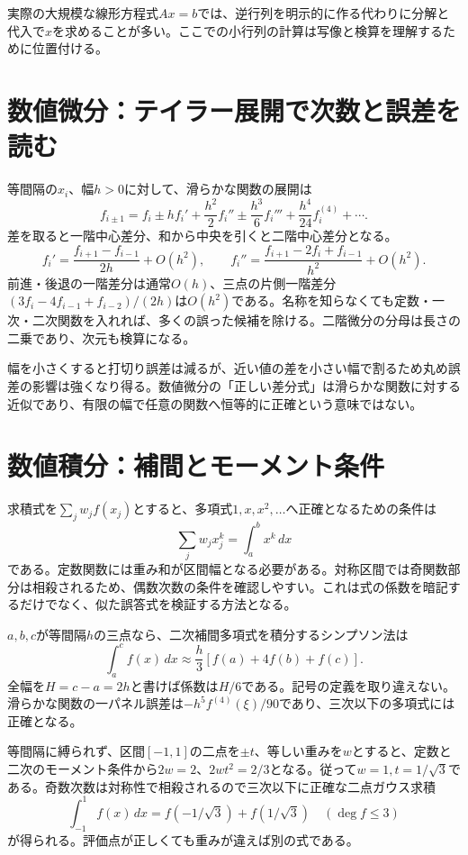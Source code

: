実際の大規模な線形方程式$Ax=b$では、逆行列を明示的に作る代わりに分解と代入で$x$を求めることが多い。ここでの小行列の計算は写像と検算を理解するために位置付ける。

\section{数値微分：テイラー展開で次数と誤差を読む}
\label{theory:analysis:difference}
等間隔の$x_i$、幅$h>0$に対して、滑らかな関数の展開は
\[
 f_{i\pm1}=f_i\pm hf_i'+\frac{h^2}{2}f_i''
 \pm\frac{h^3}{6}f_i'''+\frac{h^4}{24}f_i^{(4)}+\cdots.
\]
差を取ると一階中心差分、和から中央を引くと二階中心差分となる。
\[
 f_i'=\frac{f_{i+1}-f_{i-1}}{2h}+O(h^2),\qquad
 f_i''=\frac{f_{i+1}-2f_i+f_{i-1}}{h^2}+O(h^2).
\]
前進・後退の一階差分は通常$O(h)$、三点の片側一階差分$(3f_i-4f_{i-1}+f_{i-2})/(2h)$は$O(h^2)$である。名称を知らなくても定数・一次・二次関数を入れれば、多くの誤った候補を除ける。二階微分の分母は長さの二乗であり、次元も検算になる。

幅を小さくすると打切り誤差は減るが、近い値の差を小さい幅で割るため丸め誤差の影響は強くなり得る。数値微分の「正しい差分式」は滑らかな関数に対する近似であり、有限の幅で任意の関数へ恒等的に正確という意味ではない。

\section{数値積分：補間とモーメント条件}
\label{theory:analysis:quadrature}
求積式を$\sum_jw_jf(x_j)$とすると、多項式$1,x,x^2,\ldots$へ正確となるための条件は
\[
 \sum_jw_jx_j^k=\int_a^b x^k\,dx
\]
である。定数関数には重み和が区間幅となる必要がある。対称区間では奇関数部分は相殺されるため、偶数次数の条件を確認しやすい。これは式の係数を暗記するだけでなく、似た誤答式を検証する方法となる。

$a,b,c$が等間隔$h$の三点なら、二次補間多項式を積分するシンプソン法は
\[
 \int_a^cf(x)\,dx\approx\frac h3[f(a)+4f(b)+f(c)].
\]
全幅を$H=c-a=2h$と書けば係数は$H/6$である。記号の定義を取り違えない。滑らかな関数の一パネル誤差は$-h^5f^{(4)}(\xi)/90$であり、三次以下の多項式には正確となる\parencite{nist_quadrature}。

等間隔に縛られず、区間$[-1,1]$の二点を$\pm t$、等しい重みを$w$とすると、定数と二次のモーメント条件から$2w=2$、$2wt^2=2/3$となる。従って$w=1,t=1/\sqrt3$である。奇数次数は対称性で相殺されるので三次以下に正確な二点ガウス求積
\[
 \int_{-1}^1f(x)\,dx=f(-1/\sqrt3)+f(1/\sqrt3)
 \quad (\deg f\le3)
\]
が得られる。評価点が正しくても重みが違えば別の式である。


